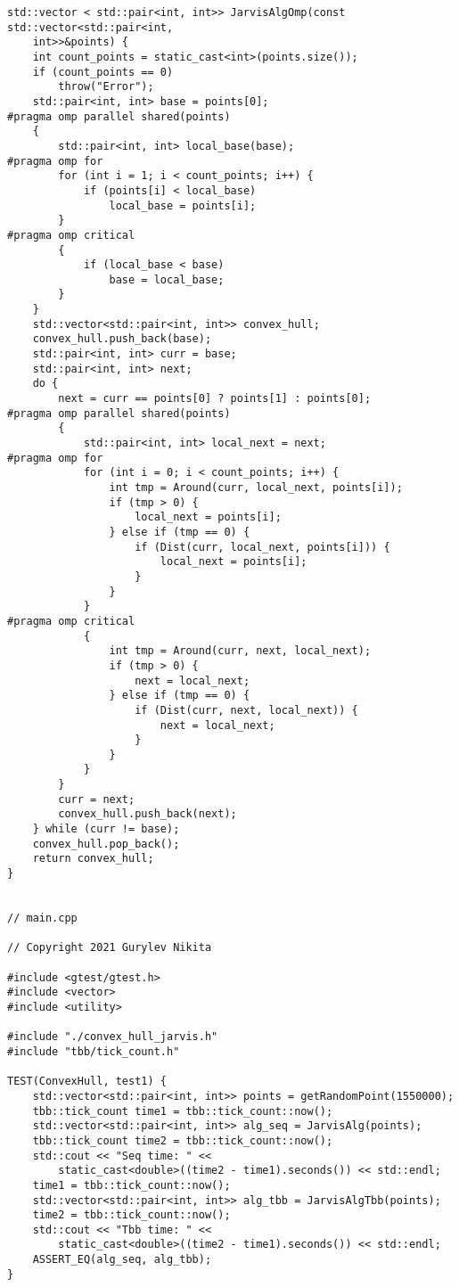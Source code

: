 \documentclass{report}
\begin{document}
\begin{lstlisting}
std::vector < std::pair<int, int>> JarvisAlgOmp(const std::vector<std::pair<int,
    int>>&points) {
    int count_points = static_cast<int>(points.size());
    if (count_points == 0)
        throw("Error");
    std::pair<int, int> base = points[0];
#pragma omp parallel shared(points)
    {
        std::pair<int, int> local_base(base);
#pragma omp for
        for (int i = 1; i < count_points; i++) {
            if (points[i] < local_base)
                local_base = points[i];
        }
#pragma omp critical
        {
            if (local_base < base)
                base = local_base;
        }
    }
    std::vector<std::pair<int, int>> convex_hull;
    convex_hull.push_back(base);
    std::pair<int, int> curr = base;
    std::pair<int, int> next;
    do {
        next = curr == points[0] ? points[1] : points[0];
#pragma omp parallel shared(points)
        {
            std::pair<int, int> local_next = next;
#pragma omp for
            for (int i = 0; i < count_points; i++) {
                int tmp = Around(curr, local_next, points[i]);
                if (tmp > 0) {
                    local_next = points[i];
                } else if (tmp == 0) {
                    if (Dist(curr, local_next, points[i])) {
                        local_next = points[i];
                    }
                }
            }
#pragma omp critical
            {
                int tmp = Around(curr, next, local_next);
                if (tmp > 0) {
                    next = local_next;
                } else if (tmp == 0) {
                    if (Dist(curr, next, local_next)) {
                        next = local_next;
                    }
                }
            }
        }
        curr = next;
        convex_hull.push_back(next);
    } while (curr != base);
    convex_hull.pop_back();
    return convex_hull;
}


// main.cpp

// Copyright 2021 Gurylev Nikita

#include <gtest/gtest.h>
#include <vector>
#include <utility>

#include "./convex_hull_jarvis.h"
#include "tbb/tick_count.h"

TEST(ConvexHull, test1) {
    std::vector<std::pair<int, int>> points = getRandomPoint(1550000);
    tbb::tick_count time1 = tbb::tick_count::now();
    std::vector<std::pair<int, int>> alg_seq = JarvisAlg(points);
    tbb::tick_count time2 = tbb::tick_count::now();
    std::cout << "Seq time: " <<
        static_cast<double>((time2 - time1).seconds()) << std::endl;
    time1 = tbb::tick_count::now();
    std::vector<std::pair<int, int>> alg_tbb = JarvisAlgTbb(points);
    time2 = tbb::tick_count::now();
    std::cout << "Tbb time: " <<
        static_cast<double>((time2 - time1).seconds()) << std::endl;
    ASSERT_EQ(alg_seq, alg_tbb);
}


\end{lstlisting}
\end{document}
